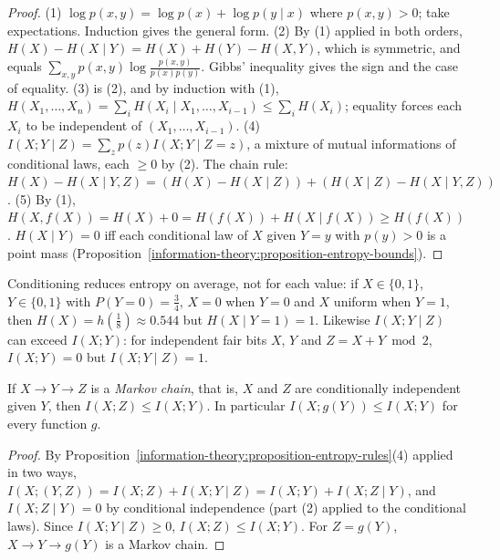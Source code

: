 \begin{proof}
(1) $\log p(x, y) = \log p(x) + \log p(y \mid x)$ where $p(x, y) > 0$; take expectations. Induction gives the general form.
(2) By (1) applied in both orders, $H(X) - H(X \mid Y) = H(X) + H(Y) - H(X, Y)$, which is symmetric, and equals $\sum_{x,y}p(x, y)\log\frac{p(x, y)}{p(x)p(y)}$. Gibbs' inequality gives the sign and the case of equality.
(3) is (2), and by induction with (1), $H(X_1, \ldots, X_n) = \sum_iH(X_i \mid X_1, \ldots, X_{i-1}) \leq \sum_iH(X_i)$; equality forces each $X_i$ to be independent of $(X_1, \ldots, X_{i-1})$.
(4) $I(X; Y \mid Z) = \sum_zp(z)I(X; Y \mid Z = z)$, a mixture of mutual informations of conditional laws, each $\geq 0$ by (2). The chain rule: $H(X) - H(X \mid Y, Z) = (H(X) - H(X \mid Z)) + (H(X \mid Z) - H(X \mid Y, Z))$.
(5) By (1), $H(X, f(X)) = H(X) + 0 = H(f(X)) + H(X \mid f(X)) \geq H(f(X))$. $H(X \mid Y) = 0$ iff each conditional law of $X$ given $Y = y$ with $p(y) > 0$ is a point mass (Proposition~\ref{information-theory:proposition-entropy-bounds}).
\end{proof}

\begin{counterexample}\label{information-theory:counterexample-conditioning}
Conditioning reduces entropy on average, not for each value: if $X \in \{0, 1\}$, $Y \in \{0, 1\}$ with $P(Y = 0) = \frac34$, $X = 0$ when $Y = 0$ and $X$ uniform when $Y = 1$, then $H(X) = h(\frac18) \approx 0.544$ but
$H(X \mid Y = 1) = 1$. Likewise $I(X; Y \mid Z)$ can exceed $I(X; Y)$: for independent fair bits $X$, $Y$ and $Z = X + Y \bmod 2$, $I(X; Y) = 0$ but $I(X; Y \mid Z) = 1$.
\end{counterexample}

\begin{theorem}\label{information-theory:theorem-data-processing}
If $X \to Y \to Z$ is a \emph{Markov chain}, that is, $X$ and $Z$ are conditionally independent given $Y$, then $I(X; Z) \leq I(X; Y)$. In particular $I(X; g(Y)) \leq I(X; Y)$ for every function $g$.
\end{theorem}

\begin{proof}
By Proposition~\ref{information-theory:proposition-entropy-rules}(4) applied in two ways, $I(X; (Y, Z)) = I(X; Z) + I(X; Y \mid Z) = I(X; Y) + I(X; Z \mid Y)$, and $I(X; Z \mid Y) = 0$ by conditional independence (part (2)
applied to the conditional laws). Since $I(X; Y \mid Z) \geq 0$, $I(X; Z) \leq I(X; Y)$. For $Z = g(Y)$, $X \to Y \to g(Y)$ is a Markov chain.
\end{proof}

